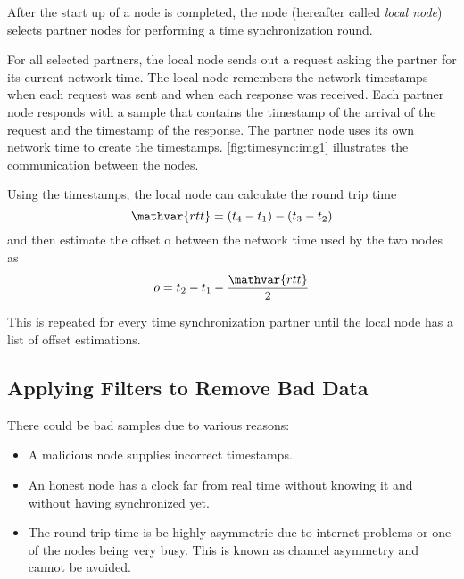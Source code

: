 After the start up of a node is completed, the node (hereafter called \emph{local node}) selects partner nodes for performing a time synchronization round.

For all selected partners, the local node sends out a request asking the partner for its current network time.
The local node remembers the network timestamps when each request was sent and when each response was received.
Each partner node responds with a sample that contains the timestamp of the arrival of the request and the timestamp of the response.
The partner node uses its own network time to create the timestamps.
\autoref{fig:timesync:img1} illustrates the communication between the nodes.

\begin{figure}
\end{figure}

Using the timestamps, the local node can calculate the round trip time
$$\mathvar{rtt} = (t_4 - t_1) - (t_3 - t_2)$$
and then estimate the offset o between the network time used by the two nodes as
$$o = t_2 - t_1 - \frac{\mathvar{rtt}}{2}$$

This is repeated for every time synchronization partner until the local node has a list of offset estimations.

\subsection{Applying Filters to Remove Bad Data}

There could be bad samples due to various reasons:
\begin{itemize}
	\item{A malicious node supplies incorrect timestamps.}
	\item{An honest node has a clock far from real time without knowing it and without having synchronized yet.}
	\item{
		The round trip time is be highly asymmetric due to internet problems or one of the nodes being very busy.
		This is known as channel asymmetry and cannot be avoided.
	}
\end{itemize}


